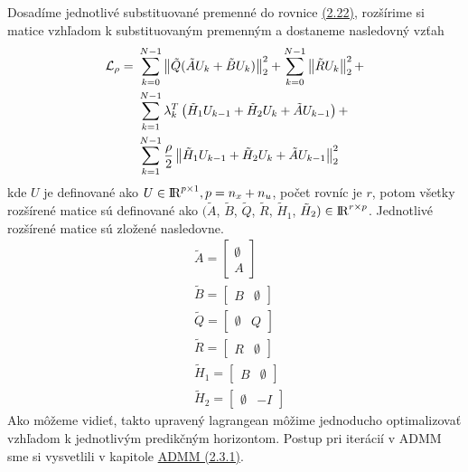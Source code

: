 Dosadíme jednotlivé substituované premenné do rovnice \hyperref[math:RozsirenyLag]{(2.22)}, rozšírime si matice vzhľadom k substituovaným premenným a dostaneme nasledovný vzťah
\begin{equation}
\begin{split}
\mathcal{L}_{\rho} =&~ \sum_{k=0}^{N-1}\left\lVert\tilde{Q}(\tilde{A}U_{k}+\tilde{B}U_{k})\right\rVert^{2}_{2}+\sum_{k=0}^{N-1}\left\lVert\tilde{R}U_k\right\rVert^{2}_{2} +\\&~\sum_{k=1}^{N-1}\lambda_{k}^{T}\left(  \tilde{H}_{1}U_{k-1} + \tilde{H}_{2}U_{k} + \tilde{A}U_{k-1} \right) +\\&~\sum_{k=1}^{N-1}\frac{\rho}{2} \left\lVert\tilde{H}_{1}U_{k-1} + \tilde{H}_{2}U_{k} + \tilde{A}U_{k-1}\right\rVert_{2}^{2}
\end{split}
\end{equation}
kde $U$ je definované ako $U \in {\rm I\!R}^{p\times1}, p = n_{x} + n_{u}$, počet rovníc je $r$, potom všetky rozšírené matice sú definované ako $(\tilde{A}$, $\tilde{B}$, $\tilde{Q}$, $\tilde{R}$, $\tilde{H}_{1}$, $\tilde{H}_{2}) \in {\rm I\!R}^{r \times p}$.
 Jednotlivé rozšírené matice sú zložené nasledovne.
\begin{align}
&\tilde{A} = \begin{bmatrix}
\emptyset\\
A
\end{bmatrix}\\
&\tilde{B} = \begin{bmatrix}
B & \emptyset
\end{bmatrix}\\
&\tilde{Q} = \begin{bmatrix}
\emptyset & Q
\end{bmatrix}\\
&\tilde{R} = \begin{bmatrix}
R & \emptyset
\end{bmatrix}\\
&\tilde{H}_{1} = \begin{bmatrix}
B & \emptyset
\end{bmatrix}\\
&\tilde{H}_{2} = \begin{bmatrix}
\emptyset & -I
\end{bmatrix}
\end{align}
\label{math:Linear_Lagrangean}\noindent
Ako môžeme vidieť, takto upravený lagrangean môžime jednoducho optimalizovať vzhľadom k jednotlivým predikčným horizontom. Postup pri iterácií v ADMM sme si vysvetlili v kapitole \hyperref[subse:ADMM2]{ADMM (2.3.1)}.
